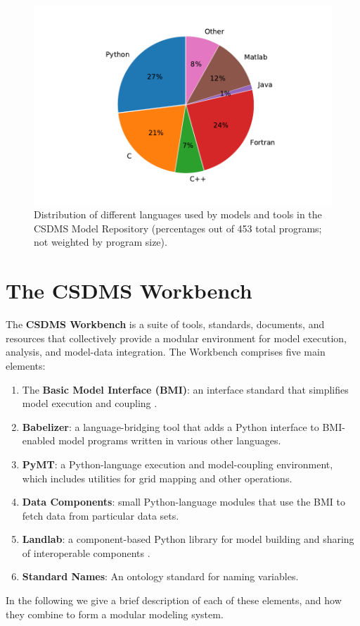 \documentclass[12pt]{amsart}
\begin{document}
\begin{figure}[h!]
\centering
\includegraphics[scale=0.8]{Figures/languages_in_repository.pdf}
\caption{Distribution of different languages used by models and tools in the CSDMS Model Repository (percentages out of 453 total programs; not weighted by program size).}
\label{fig:languages}
\end{figure}


\section{The CSDMS Workbench}
\label{sec:workbench}

The \textbf{CSDMS Workbench} is a suite of tools, standards, documents, and resources that collectively provide a modular environment for model execution, analysis, and model-data integration. The Workbench comprises five main elements: 
\begin{enumerate}
    \item The \textbf{Basic Model Interface (BMI)}: an interface standard that simplifies model execution and coupling \citep{hutton2020basic}.
    \item \textbf{Babelizer}: a language-bridging tool that adds a Python interface to BMI-enabled model programs written in various other languages.
    \item \textbf{PyMT}: a Python-language execution and model-coupling environment, which includes utilities for grid mapping and other operations.
    \item \textbf{Data Components}: small Python-language modules that use the BMI to fetch data from particular data sets.
    \item \textbf{Landlab}: a component-based Python library for model building and sharing of interoperable components \citep{hobley2017creative,barnhart2020short}.
    \item \textbf{Standard Names}: An ontology standard for naming variables.
\end{enumerate}
In the following we give a brief description of each of these elements, and how they combine to form a modular modeling system.
\end{document}
